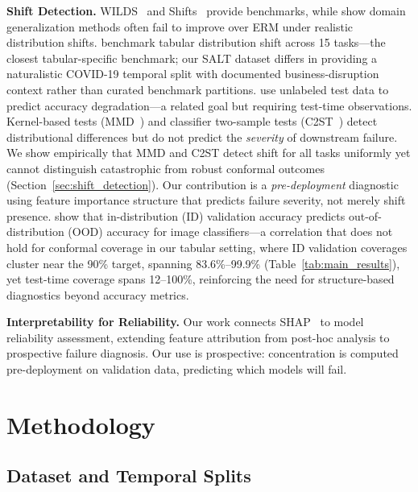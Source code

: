 \documentclass{uai2026} %
\begin{document}
\textbf{Shift Detection.} WILDS~\citep{koh2021wilds} and Shifts~\citep{malinin2021shifts} provide benchmarks, while \citet{gulrajani2021search} show domain generalization methods often fail to improve over ERM under realistic distribution shifts. \citet{gardner2023tableshift} benchmark tabular distribution shift across 15 tasks---the closest tabular-specific benchmark; our SALT dataset differs in providing a naturalistic COVID-19 temporal split with documented business-disruption context rather than curated benchmark partitions. \citet{garg2022leveraging} use unlabeled test data to predict accuracy degradation---a related goal but requiring test-time observations. Kernel-based tests (MMD~\citep{gretton2012kernel}) and classifier two-sample tests (C2ST~\citep{lopez2017revisiting}) detect distributional differences but do not predict the \textit{severity} of downstream failure. We show empirically that MMD and C2ST detect shift for all tasks uniformly yet cannot distinguish catastrophic from robust conformal outcomes (Section~\ref{sec:shift_detection}). Our contribution is a \textit{pre-deployment} diagnostic using feature importance structure that predicts failure severity, not merely shift presence. \citet{miller2021accuracy} show that in-distribution (ID) validation accuracy predicts out-of-distribution (OOD) accuracy for image classifiers---a correlation that does not hold for conformal coverage in our tabular setting, where ID validation coverages cluster near the 90\% target, spanning 83.6\%--99.9\% (Table~\ref{tab:main_results}), yet test-time coverage spans 12--100\%, reinforcing the need for structure-based diagnostics beyond accuracy metrics.

\textbf{Interpretability for Reliability.} Our work connects SHAP~\citep{lundberg2017unified,lundberg2020local} to model reliability assessment, extending feature attribution from post-hoc analysis to prospective failure diagnosis. Our use is prospective: concentration is computed pre-deployment on validation data, predicting which models will fail.

\section{Methodology}\label{sec:method}

\subsection{Dataset and Temporal Splits}
\end{document}
